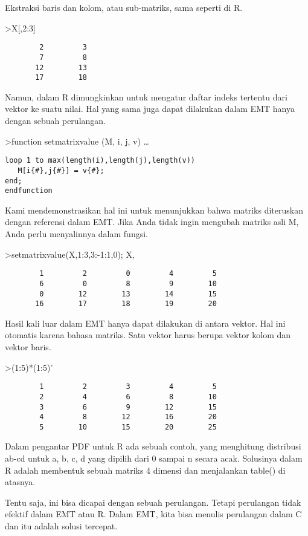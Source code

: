 \documentclass[
]{book}
\begin{document}
Ekstraksi baris dan kolom, atau sub-matriks, sama seperti di R.

\textgreater X{[},2:3{]}

\begin{verbatim}
        2         3 
        7         8 
       12        13 
       17        18 
\end{verbatim}

Namun, dalam R dimungkinkan untuk mengatur daftar indeks tertentu dari vektor ke suatu nilai. Hal yang sama juga dapat dilakukan dalam EMT hanya dengan sebuah perulangan.

\textgreater function setmatrixvalue (M, i, j, v) \ldots{}

\begin{verbatim}
loop 1 to max(length(i),length(j),length(v))
   M[i{#},j{#}] = v{#};
end;
endfunction
\end{verbatim}

Kami mendemonstrasikan hal ini untuk menunjukkan bahwa matriks diteruskan dengan referensi dalam EMT. Jika Anda tidak ingin mengubah matriks asli M, Anda perlu menyalinnya dalam fungsi.

\textgreater setmatrixvalue(X,1:3,3:-1:1,0); X,

\begin{verbatim}
        1         2         0         4         5 
        6         0         8         9        10 
        0        12        13        14        15 
       16        17        18        19        20 
\end{verbatim}

Hasil kali luar dalam EMT hanya dapat dilakukan di antara vektor. Hal ini otomatis karena bahasa matriks. Satu vektor harus berupa vektor kolom dan vektor baris.

\textgreater(1:5)*(1:5)'

\begin{verbatim}
        1         2         3         4         5 
        2         4         6         8        10 
        3         6         9        12        15 
        4         8        12        16        20 
        5        10        15        20        25 
\end{verbatim}

Dalam pengantar PDF untuk R ada sebuah contoh, yang menghitung distribusi ab-cd untuk a, b, c, d yang dipilih dari 0 sampai n secara acak. Solusinya dalam R adalah membentuk sebuah matriks 4 dimensi dan menjalankan table() di atasnya.

Tentu saja, ini bisa dicapai dengan sebuah perulangan. Tetapi perulangan tidak efektif dalam EMT atau R. Dalam EMT, kita bisa menulis perulangan dalam C dan itu adalah solusi tercepat.
\end{document}
